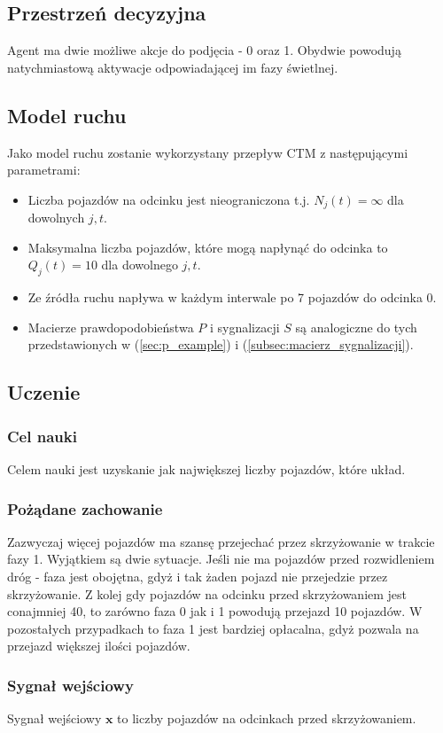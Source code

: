 \documentclass[12pt]{book}
\theoremstyle{plain}
\newcommand{\myref}[1]{(\ref{#1})}
\begin{document}
\subsection{Przestrzeń decyzyjna}
Agent ma dwie możliwe akcje do podjęcia - 0 oraz 1. Obydwie powodują natychmiastową aktywacje odpowiadającej im fazy świetlnej.

\subsection{Model ruchu}
Jako model ruchu zostanie wykorzystany przepływ CTM z następującymi parametrami:
\begin{itemize}
	\item Liczba pojazdów na odcinku jest nieograniczona t.j. $N_j(t)=\infty$ dla dowolnych $j,t$.
	\item Maksymalna liczba pojazdów, które mogą napłynąć do odcinka to $Q_j(t)=10$ dla dowolnego $j,t$.
	\item Ze źródła ruchu napływa w każdym interwale po 7 pojazdów do odcinka 0.
	\item Macierze prawdopodobieństwa $P$ i sygnalizacji $S$ są analogiczne do tych przedstawionych w \myref{sec:p_example} i \myref{subsec:macierz_sygnalizacji}.
\end{itemize}

\subsection{Uczenie}
\subsubsection*{Cel nauki}
Celem nauki jest uzyskanie jak największej liczby pojazdów, które układ.
\subsubsection*{Pożądane zachowanie}
Zazwyczaj więcej pojazdów ma szansę przejechać przez skrzyżowanie w trakcie fazy 1. Wyjątkiem są dwie sytuacje. Jeśli nie ma pojazdów przed rozwidleniem dróg - faza jest obojętna, gdyż i tak żaden pojazd nie przejedzie przez skrzyżowanie. Z kolej gdy pojazdów na odcinku przed skrzyżowaniem jest conajmniej 40, to zarówno faza 0 jak i 1 powodują przejazd 10 pojazdów. W pozostałych przypadkach to faza 1 jest bardziej opłacalna, gdyż pozwala na przejazd większej ilości pojazdów.
\subsubsection*{Sygnał wejściowy}
Sygnał wejściowy $\textbf{x}$ to liczby pojazdów na odcinkach przed skrzyżowaniem.
\end{document}
